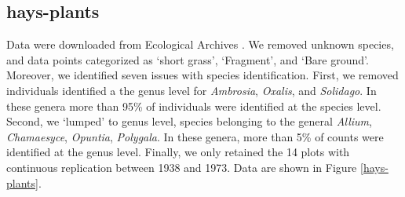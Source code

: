 \documentclass[11pt, oneside]{article}
\begin{document}
\subsection{hays-plants}
Data were downloaded from Ecological Archives \citep{hay_data}.
We removed unknown species, and data points categorized as `short grass', `Fragment', and `Bare ground'. 
Moreover, we identified seven issues with species identification. 
First, we removed individuals identified a the genus level for \textit{Ambrosia}, \textit{Oxalis}, and \textit{Solidago}. 
In these genera more than 95\% of individuals were identified at the species level. 
Second, we `lumped' to genus level, species belonging to the general \textit{Allium}, \textit{Chamaesyce}, \textit{Opuntia}, \textit{Polygala}. 
In these genera, more than 5\% of counts were identified at the genus level. 
Finally, we only retained the 14 plots with continuous replication between 1938 and 1973.
Data are shown in Figure \ref{hays-plants}.
\end{document}
